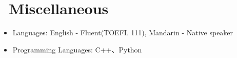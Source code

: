 \documentclass{resume}
\begin{document}
\section{\faInfo\ Miscellaneous}
\begin{itemize}[parsep=0.5ex]
  \item Languages: English - Fluent(TOEFL 111), Mandarin - Native speaker
  \item Programming Languages: C++、Python
\end{itemize}

%
%
\end{document}
